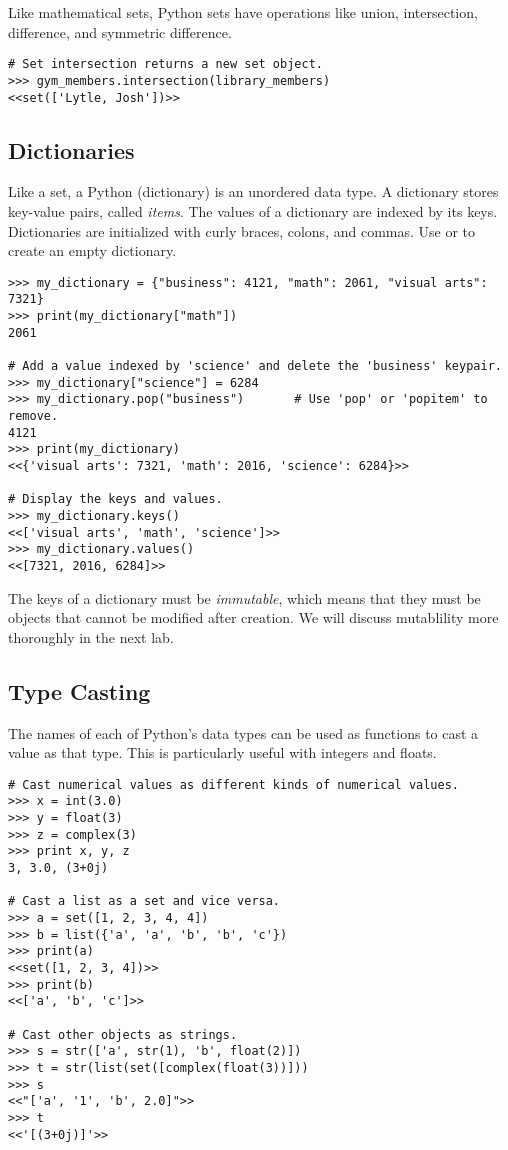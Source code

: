 Like mathematical sets, Python sets have operations like union, intersection, 
difference, and symmetric difference.
\begin{lstlisting}
# Set intersection returns a new set object.
>>> gym_members.intersection(library_members)
<<set(['Lytle, Josh'])>>
\end{lstlisting}


\subsection*{Dictionaries}
Like a set, a Python  (dictionary) is an unordered data type.
A dictionary stores key-value pairs, called \emph{items}.
The values of a dictionary are indexed by its keys.
Dictionaries are initialized with curly braces, colons, and commas.
Use  or \li{\{\}} to create an empty dictionary.
\begin{lstlisting}
>>> my_dictionary = {"business": 4121, "math": 2061, "visual arts": 7321} 
>>> print(my_dictionary["math"])
2061

# Add a value indexed by 'science' and delete the 'business' keypair.
>>> my_dictionary["science"] = 6284
>>> my_dictionary.pop("business")       # Use 'pop' or 'popitem' to remove.
4121
>>> print(my_dictionary)
<<{'visual arts': 7321, 'math': 2016, 'science': 6284}>>

# Display the keys and values.
>>> my_dictionary.keys()
<<['visual arts', 'math', 'science']>>
>>> my_dictionary.values()
<<[7321, 2016, 6284]>>
\end{lstlisting}

The keys of a dictionary must be \emph{immutable}, which means that they must be objects that cannot be modified after creation.
We will discuss mutablility more thoroughly in the next lab.

\subsection*{Type Casting}

The names of each of Python's data types can be used as functions to cast a value as that type.
This is particularly useful with integers and floats.
\begin{lstlisting}
# Cast numerical values as different kinds of numerical values.
>>> x = int(3.0)
>>> y = float(3)
>>> z = complex(3)
>>> print x, y, z
3, 3.0, (3+0j)

# Cast a list as a set and vice versa.
>>> a = set([1, 2, 3, 4, 4])
>>> b = list({'a', 'a', 'b', 'b', 'c'})
>>> print(a)
<<set([1, 2, 3, 4])>>
>>> print(b)
<<['a', 'b', 'c']>>

# Cast other objects as strings.
>>> s = str(['a', str(1), 'b', float(2)])
>>> t = str(list(set([complex(float(3))]))
>>> s
<<"['a', '1', 'b', 2.0]">>
>>> t
<<'[(3+0j)]'>>

\end{lstlisting}

